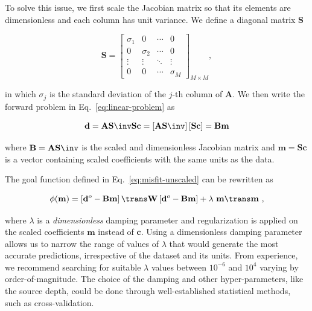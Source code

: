 To solve this issue, we first scale the Jacobian matrix so that its elements
are dimensionless and each column has unit variance.
We define a diagonal matrix $\mathbf{S}$

\begin{equation}
    \mathbf{S} =
    \begin{bmatrix}
      \sigma_1 & 0 & \cdots &0 \\
      0 & \sigma_2 & \cdots &0 \\
      \vdots & \vdots & \ddots & \vdots \\
      0  & 0 & \cdots & \sigma_M
    \end{bmatrix}_{M \times M}
    ,
\end{equation}

\noindent in which $\sigma_j$ is the standard deviation of the $j$-th column of
$\mathbf{A}$.
We then write the forward problem in Eq.~\ref{eq:linear-problem} as

\begin{equation}
    \mathbf{d}
    =
    \mathbf{A} \mathbf{S}\inv \mathbf{S} \mathbf{c}
    =
    \left[
        \mathbf{A} \mathbf{S}\inv
    \right]
    \left[
        \mathbf{S} \mathbf{c}
    \right]
    =
    \mathbf{B} \mathbf{m}
\end{equation}

\noindent where $\mathbf{B} = \mathbf{A} \mathbf{S}\inv$ is the scaled and
dimensionless Jacobian matrix
and $\mathbf{m} = \mathbf{S} \mathbf{c}$ is a vector containing scaled
coefficients with the same units as the data.

The goal function defined in Eq.~\ref{eq:misfit-unscaled} can be
rewritten as

\begin{equation}
    \phi(\mathbf{m}) =
    \left[\mathbf{d}^o - \mathbf{B}\mathbf{m}\right]\trans
    \mathbf{W}
    \left[\mathbf{d}^o - \mathbf{B}\mathbf{m}\right]
    + \lambda\ \mathbf{m}\trans\mathbf{m}
    \ ,
    \label{eq:misfit}
\end{equation}

\noindent where $\lambda$ is a \emph{dimensionless} damping parameter and
regularization is applied on the scaled coefficients $\mathbf{m}$ instead of
$\mathbf{c}$.
Using a dimensionless damping parameter allows us to narrow the range of values
of $\lambda$ that would generate the most accurate predictions, irrespective
of the dataset and its units.
From experience, we recommend searching for suitable $\lambda$ values between
$10^{-6}$ and $10^{4}$ varying by order-of-magnitude.
The choice of the damping and other hyper-parameters, like the source depth,
could be done through well-established statistical methods, such as
cross-validation.

